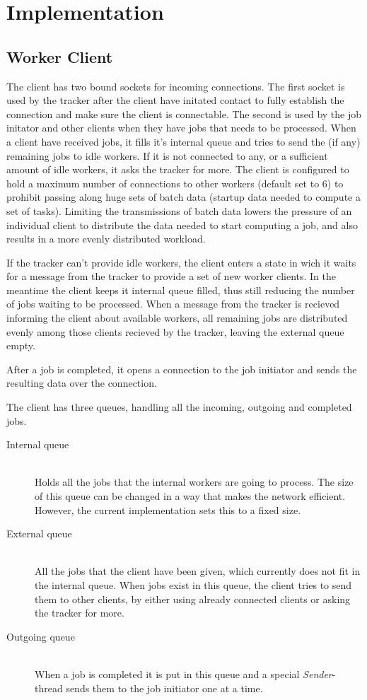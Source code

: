 \chapter{Implementation}


\section{Worker Client}
The client has two bound sockets for incoming connections. The first socket is used by the tracker after the client have initated contact to fully establish the connection and make sure the client is connectable.
The second is used by the job initator and other clients when they have jobs that needs to be processed.
When a client have received jobs, it fills it's internal queue and tries to send the (if any) remaining jobs to idle workers.
If it is not connected to any, or a sufficient amount of idle workers, it asks the tracker for more. The client is configured to hold a maximum number of connections to other workers (default set to 6) to prohibit passing along huge sets of batch data (startup data needed to compute a set of tasks). Limiting the transmissions of batch data lowers the pressure of an individual client to distribute the data needed to start computing a job, and also results in a more evenly distributed workload.

If the tracker can't provide idle workers, the client enters a state in wich it waits for a message from the tracker to provide a set of new worker clients. In the meantime the client keeps it internal queue filled, thus still reducing the number of jobs waiting to be processed. When a message from the tracker is recieved informing the client about available workers, all remaining jobs are distributed evenly among those clients recieved by the tracker, leaving the external queue empty.

After a job is completed, it opens a connection to the job initiator and sends the resulting data over the connection.

The client has three queues, handling all the incoming, outgoing and completed jobs.
\begin{description}
	\item[Internal queue] \hfill \\
	Holds all the jobs that the internal workers are going to process. The size of this queue can be changed in a way that makes the network efficient. However, the current implementation sets this to a fixed size.
	\item[External queue] \hfill \\
	All the jobs that the client have been given, which currently does not fit in the internal queue.
	When jobs exist in this queue, the client tries to send them to other clients, by either using already connected clients or asking the tracker for more.
	\item[Outgoing queue] \hfill \\
	When a job is completed it is put in this queue and a special \textit{Sender}-thread sends them to the job initiator one at a time.
\end{description}


